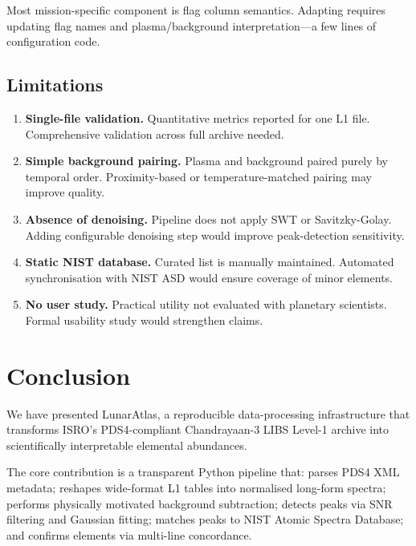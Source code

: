 \documentclass[a4paper,twocolumn,10pt]{article}
\begin{document}
Most mission-specific component is flag column semantics. Adapting
requires updating flag names and plasma/background interpretation---a
few lines of configuration code.

\subsection{Limitations}

\begin{enumerate}[nosep,leftmargin=*]
  \item \textbf{Single-file validation.} Quantitative metrics reported
    for one L1 file. Comprehensive validation across full archive
    needed.

  \item \textbf{Simple background pairing.} Plasma and background
    paired purely by temporal order. Proximity-based or
    temperature-matched pairing may improve quality.

  \item \textbf{Absence of denoising.} Pipeline does not apply SWT or
    Savitzky-Golay. Adding configurable denoising step would improve
    peak-detection sensitivity.

  \item \textbf{Static NIST database.} Curated list is manually
    maintained. Automated synchronisation with NIST ASD would ensure
    coverage of minor elements.

  \item \textbf{No user study.} Practical utility not evaluated with
    planetary scientists. Formal usability study would strengthen
    claims.
\end{enumerate}

\section{Conclusion}
\label{sec:conclusion}

We have presented LunarAtlas, a reproducible data-processing
infrastructure that transforms ISRO's PDS4-compliant Chandrayaan-3 LIBS
Level-1 archive into scientifically interpretable elemental abundances.

The core contribution is a transparent Python pipeline that: parses
PDS4 XML metadata; reshapes wide-format L1 tables into normalised
long-form spectra; performs physically motivated background subtraction;
detects peaks via SNR filtering and Gaussian fitting; matches peaks to
NIST Atomic Spectra Database; and confirms elements via multi-line
concordance.
\end{document}
